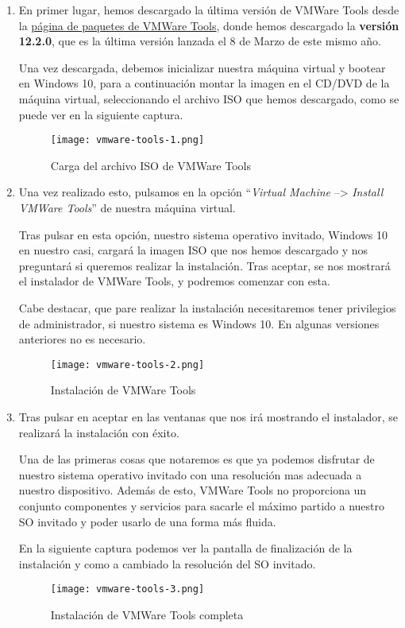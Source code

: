 \begin{enumerate}
    \item En primer lugar, hemos descargado la última versión de VMWare Tools desde la \href{https://packages.vmware.com/tools/releases/latest/windows/x64/}{página de paquetes de VMWare Tools}, donde hemos descargado la \textbf{versión 12.2.0}, que es la última versión lanzada el 8 de Marzo de este mismo año.

    Una vez descargada, debemos inicializar nuestra máquina virtual y bootear en Windows 10, para a continuación montar la imagen en el CD/DVD de la máquina virtual, seleccionando el archivo ISO que hemos descargado, como se puede ver en la siguiente captura.

    \begin{figure}[H]
        \centering
        \texttt{[image: vmware-tools-1.png]}
        \caption{Carga del archivo ISO de VMWare Tools}
    \end{figure}

    \item Una vez realizado esto, pulsamos en la opción ``\textit{Virtual Machine} --> \textit{Install VMWare Tools}'' de nuestra máquina virtual.

    Tras pulsar en esta opción, nuestro sistema operativo invitado, Windows 10 en nuestro casi, cargará la imagen ISO que nos hemos descargado y nos preguntará si queremos realizar la instalación. Tras aceptar, se nos mostrará el instalador de VMWare Tools, y podremos comenzar con esta.

    Cabe destacar, que pare realizar la instalación necesitaremos tener privilegios de administrador, si nuestro sistema es Windows 10. En algunas versiones anteriores no es necesario.

     \begin{figure}[H]
        \centering
        \texttt{[image: vmware-tools-2.png]}
        \caption{Instalación de VMWare Tools}
    \end{figure}

    \item Tras pulsar en aceptar en las ventanas que nos irá mostrando el instalador, se realizará la instalación con éxito.

    Una de las primeras cosas que notaremos es que ya podemos disfrutar de nuestro sistema operativo invitado con una resolución mas adecuada a nuestro dispositivo. Además de esto, VMWare Tools no proporciona un conjunto componentes y servicios para sacarle el máximo partido a nuestro SO invitado y poder usarlo de una forma más fluida. \cite{vmware01}

    En la siguiente captura podemos ver la pantalla de finalización de la instalación y como a cambiado la resolución del SO invitado.

    \begin{figure}[H]
        \centering
        \texttt{[image: vmware-tools-3.png]}
        \caption{Instalación de VMWare Tools completa}
    \end{figure}
\end{enumerate}

